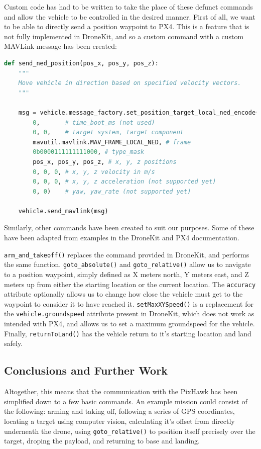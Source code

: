 \documentclass[10pt]{article}
\begin{document}
Custom code has had to be written to take the place of these defunct commands and allow the vehicle to be controlled in the desired manner. First of all, we want to be able to directly send a position waypoint to PX4. This is a feature that is not fully implemented in DroneKit, and so a custom command with a custom MAVLink message has been created:
\begin{lstlisting}[language=Python]
def send_ned_position(pos_x, pos_y, pos_z):
    """
    Move vehicle in direction based on specified velocity vectors.
    """

    msg = vehicle.message_factory.set_position_target_local_ned_encode(
        0,       # time_boot_ms (not used)
        0, 0,    # target system, target component
        mavutil.mavlink.MAV_FRAME_LOCAL_NED, # frame
        0b0000111111111000, # type_mask
        pos_x, pos_y, pos_z, # x, y, z positions
        0, 0, 0, # x, y, z velocity in m/s
        0, 0, 0, # x, y, z acceleration (not supported yet)
        0, 0)    # yaw, yaw_rate (not supported yet)

    vehicle.send_mavlink(msg)
\end{lstlisting}

Similarly, other commands have been created to suit our purposes. Some of these have been adapted from examples in the DroneKit and PX4 documentation.\cite{dronekit}\cite{PX4_dev_guide}

\lstinline|arm_and_takeoff()| replaces the command provided in DroneKit, and performs the same function. \lstinline|goto_absolute()| and \lstinline|goto_relative()| allow us to navigate to a position waypoint, simply defined as X meters north, Y meters east, and Z meters up from either the starting location or the current location. The \lstinline|accuracy| attribute optionally allows us to change how close the vehicle must get to the waypoint to consider it to have reached it. \lstinline|setMaxXYSpeed()| is a replacement for the \lstinline|vehicle.groundspeed| attribute present in DroneKit, which does not work as intended with PX4, and allows us to set a maximum groundspeed for the vehicle. Finally, \lstinline|returnToLand()| has the vehicle return to it's starting location and land safely.

\subsection{Conclusions and Further Work}
Altogether, this means that the communication with the PixHawk has been simplified down to a few basic commands. An example mission could consist of the following: arming and taking off, following a series of GPS coordinates, locating a target using computer vision, calculating it's offset from directly underneath the drone, using \lstinline|goto_relative()| to position itself precisely over the target, droping the payload, and returning to base and landing.
\end{document}

